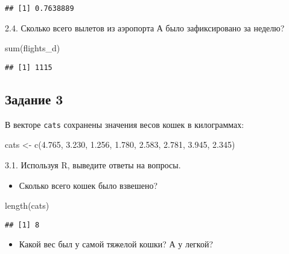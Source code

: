 \documentclass[
]{article}
\newenvironment{Shaded}{\begin{snugshade}}{\end{snugshade}}
\newcommand{\FloatTok}[1]{\textcolor[rgb]{0.00,0.00,0.81}{#1}}
\newcommand{\FunctionTok}[1]{\textcolor[rgb]{0.00,0.00,0.00}{#1}}
\newcommand{\NormalTok}[1]{#1}
\newcommand{\OtherTok}[1]{\textcolor[rgb]{0.56,0.35,0.01}{#1}}
\providecommand{\tightlist}{%
  \setlength{\itemsep}{0pt}\setlength{\parskip}{0pt}}
\begin{document}
\begin{verbatim}
## [1] 0.7638889
\end{verbatim}

2.4. Сколько всего вылетов из аэропорта А было зафиксировано за неделю?

\begin{Shaded}
\begin{Highlighting}[]
\FunctionTok{sum}\NormalTok{(flights\_d)}
\end{Highlighting}
\end{Shaded}

\begin{verbatim}
## [1] 1115
\end{verbatim}

\hypertarget{ux437ux430ux434ux430ux43dux438ux435-3}{%
\subsection{Задание 3}\label{ux437ux430ux434ux430ux43dux438ux435-3}}

В векторе \texttt{cats} сохранены значения весов кошек в килограммах:

\begin{Shaded}
\begin{Highlighting}[]
\NormalTok{cats }\OtherTok{\textless{}{-}} \FunctionTok{c}\NormalTok{(}\FloatTok{4.765}\NormalTok{, }\FloatTok{3.230}\NormalTok{, }\FloatTok{1.256}\NormalTok{, }\FloatTok{1.780}\NormalTok{, }\FloatTok{2.583}\NormalTok{, }\FloatTok{2.781}\NormalTok{, }\FloatTok{3.945}\NormalTok{, }\FloatTok{2.345}\NormalTok{)}
\end{Highlighting}
\end{Shaded}

3.1. Используя R, выведите ответы на вопросы.

\begin{itemize}
\tightlist
\item
  Сколько всего кошек было взвешено?
\end{itemize}

\begin{Shaded}
\begin{Highlighting}[]
\FunctionTok{length}\NormalTok{(cats)}
\end{Highlighting}
\end{Shaded}

\begin{verbatim}
## [1] 8
\end{verbatim}

\begin{itemize}
\tightlist
\item
  Какой вес был у самой тяжелой кошки? А у легкой?
\end{itemize}
\end{document}

